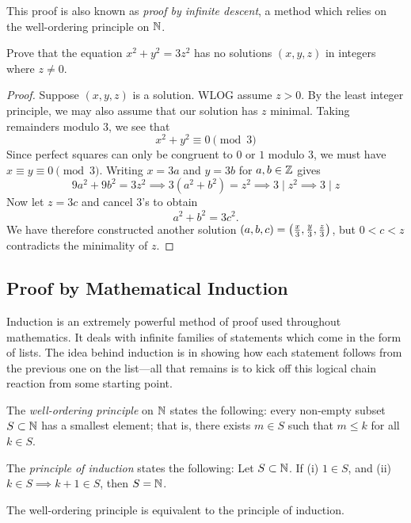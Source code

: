 \begin{remark}
This proof is also known as \emph{proof by infinite descent}, a method which relies on the well-ordering principle on $\mathbb N$.
\end{remark}

\begin{example}
Prove that the equation $x^2+y^2=3z^2$ has no solutions $(x,y,z)$ in integers where $z\neq0$.

\begin{proof}
Suppose $(x,y,z)$ is a solution. WLOG assume $z>0$. By the least integer principle, we may also assume that our solution has $z$ minimal. Taking remainders modulo $3$, we see that
\[ x^2+y^2\equiv0\pmod3 \]
Since perfect squares can only be congruent to $0$ or $1$ modulo $3$, we must have $x\equiv y\equiv 0\pmod 3$. Writing $x=3a$ and $y=3b$ for $a,b\in\mathbb Z$ gives
\[ 9a^2+9b^2=3z^2 \implies 3(a^2+b^2)=z^2 \implies 3\mid z^2 \implies 3\mid z \]
Now let $z=3c$ and cancel $3$'s to obtain
\[ a^2+b^2=3c^2. \]
We have therefore constructed another solution $(a,b,c)=\left(\frac{x}{3},\frac{y}{3},\frac{z}{3}\right)$, but $0<c<z$ contradicts the minimality of $z$.
\end{proof}
\end{example}

\subsection{Proof by Mathematical Induction}
Induction is an extremely powerful method of proof used throughout mathematics. It deals with infinite families of statements which come in the form of lists. The idea behind induction is in showing how each statement follows from the previous one on the list---all that remains is to kick off this logical chain reaction from some starting point.

The \emph{well-ordering principle} on $\mathbb N$ states the following: every non-empty subset $S\subset\mathbb N$ has a smallest element; that is, there exists $m\in S$ such that $m\le k$ for all $k\in S$.

The \emph{principle of induction} states the following: Let $S\subset\mathbb N$. If (i) $1\in S$, and (ii) $k\in S\implies k+1\in S$, then $S=\mathbb N$.

\begin{lemma}\label{lemma:wop-poi}
The well-ordering principle is equivalent to the principle of induction.
\end{lemma}

